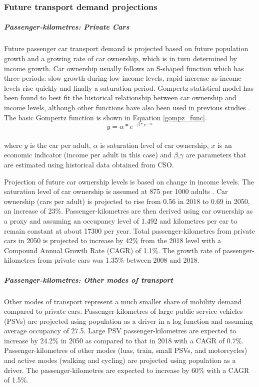 \documentclass[gmd,manuscript]{copernicus}
\begin{document}
\subsubsection{Future transport demand projections}
\subparagraph{Passenger-kilometres: Private Cars}
\label{sp:pkm private cars}
Future passenger car transport demand is projected based on future population growth and a growing rate of car ownership, which is in turn determined by income growth. Car ownership usually follows an S-shaped function which has three periods: slow growth during low income levels, rapid increase as income levels rise quickly and finally a saturation period. Gompertz statistical model has been found to best fit the historical relationship between car ownership and income levels, although other functions have also been used in previous studies \citep{Lian2018}. The basic Gompertz function is shown in Equation \ref{gompz_func}.
\\
\begin{equation} \label{gompz_func}
 y=\alpha*e^{-\beta*e^{-\gamma x}}
\end{equation}
\\
where $y$ is the car per adult, $\alpha$ is saturation level of car ownership, $x$ is an economic indicator (income per adult in this case) and $\beta$,$\gamma$ are parameters that are estimated using historical data obtained from CSO. 

Projection of future car ownership levels is based on change in income levels. The saturation level of car ownership is assumed at 875 per 1000 adults \citep{AECOMIrelandLimited2019}. Car ownership (cars per adult) is projected to rise from 0.56 in 2018 to 0.69 in 2050, an increase of 23\%. Passenger-kilometres are then derived using car ownership as a proxy and assuming an occupancy level of 1.492 and kilometres per car to remain constant at about 17300 per year. Total passenger-kilometres from private cars in 2050 is projected to increase by 42\% from the 2018 level with a Compound Annual Growth Rate (CAGR) of 1.1\%. The growth rate of passenger-kilometres from private cars was 1.35\% between 2008 and 2018. 

\subparagraph{Passenger-kilometres: Other modes of transport}
\label{sp:pkm other}
Other modes of transport represent a much smaller share of mobility demand compared to private cars. Passenger-kilometres of large public service vehicles (PSVs) are projected using population as a driver in a log function and assuming average occupancy of 27.5. Large PSV passenger-kilometres are expected to increase by 24.2\% in 2050 as compared to that in 2018 with a CAGR of 0.7\%. Passenger-kilometres of other modes (luas, train, small PSVs, and motorcycles) and active modes (walking and cycling) are projected using population as a driver. The passenger-kilometres are expected to increase by 60\% with a CAGR of 1.5\%. 
\end{document}
